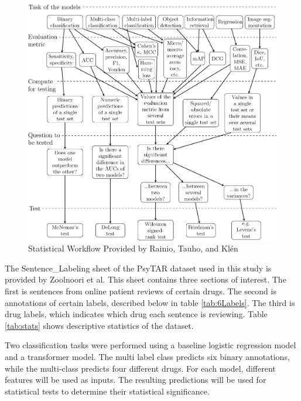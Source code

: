 \documentclass[10.7pt, onecolumn]{article}
\begin{document}
\begin{figure}[H]
  \centering
  \includegraphics[width=\textwidth]{images/41598_2024_56706_Fig3_HTML.png}
  \caption{Statistical Workflow Provided by Rainio, Tauho, and Klén\cite{statsBased}}
  \label{fig:statistical test workflow}
\end{figure}
 
The Sentence\_Labeling sheet of the PsyTAR dataset used in this study is provided by Zoolnoori et al\cite{psyTAR1}\cite{psyTar2}. This sheet contains three sections of interest. The first is sentences from online patient reviews of certain drugs. The second is annotations of certain labels, described below in table \ref{tab:6Labels}. The third is drug labels, which indicates which drug each sentence is reviewing. Table \ref{tab:stats} shows descriptive statistics of the dataset.

Two classification tasks were performed using a baseline logistic regression model and a transformer model. The multi label class predicts six binary annotations, while the multi-class predicts four different drugs. For each model, different features will be used as inputs. The resulting predictions will be used for statistical tests to determine their statistical significance. 
\end{document}
